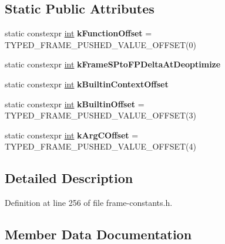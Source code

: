\subsection*{Static Public Attributes}
\begin{DoxyCompactItemize}
\item 
\mbox{\label{classv8_1_1internal_1_1BuiltinContinuationFrameConstants_a31a3611aafc0f2d70b17e52ab62ac698}} 
static constexpr \mbox{\hyperlink{classint}{int}} {\bfseries k\+Function\+Offset} = T\+Y\+P\+E\+D\+\_\+\+F\+R\+A\+M\+E\+\_\+\+P\+U\+S\+H\+E\+D\+\_\+\+V\+A\+L\+U\+E\+\_\+\+O\+F\+F\+S\+ET(0)
\item 
static constexpr \mbox{\hyperlink{classint}{int}} {\bfseries k\+Frame\+S\+Pto\+F\+P\+Delta\+At\+Deoptimize}
\item 
static constexpr \mbox{\hyperlink{classint}{int}} {\bfseries k\+Builtin\+Context\+Offset}
\item 
\mbox{\label{classv8_1_1internal_1_1BuiltinContinuationFrameConstants_a22c643d6e77fba3de414a347eeee4849}} 
static constexpr \mbox{\hyperlink{classint}{int}} {\bfseries k\+Builtin\+Offset} = T\+Y\+P\+E\+D\+\_\+\+F\+R\+A\+M\+E\+\_\+\+P\+U\+S\+H\+E\+D\+\_\+\+V\+A\+L\+U\+E\+\_\+\+O\+F\+F\+S\+ET(3)
\item 
\mbox{\label{classv8_1_1internal_1_1BuiltinContinuationFrameConstants_a78cfeac506aec0e5bb6ad934e0cd5280}} 
static constexpr \mbox{\hyperlink{classint}{int}} {\bfseries k\+Arg\+C\+Offset} = T\+Y\+P\+E\+D\+\_\+\+F\+R\+A\+M\+E\+\_\+\+P\+U\+S\+H\+E\+D\+\_\+\+V\+A\+L\+U\+E\+\_\+\+O\+F\+F\+S\+ET(4)
\end{DoxyCompactItemize}


\subsection{Detailed Description}


Definition at line 256 of file frame-\/constants.\+h.



\subsection{Member Data Documentation}
\mbox{\label{classv8_1_1internal_1_1BuiltinContinuationFrameConstants_a6b91146ee311e490eaed38db39d73124}} 
